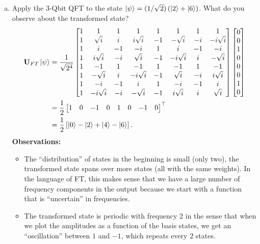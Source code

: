 \documentclass{book}
\theoremstyle{definition}
\newcommand{\nn}{\nonumber}
\newcommand{\f}[2]{\frac{#1}{#2}}
\newcommand{\lp}{\left(}
\newcommand{\rp}{\right)}
\newcommand{\lb}{\left[}
\newcommand{\rb}{\right]}
\newcommand{\lc}{\left\{}
\newcommand{\rc}{\right\}}
\newcommand{\U}{\mathbf{U}}
\begin{document}
\begin{enumerate}[(a)]
	\item Apply the 3-Qbit QFT to the state $\ket{\psi} = (1/\sqrt{2})\lp \ket{2} + \ket{6} \rp$. What do you observe about the transformed state? 
	\begin{align}
	\U_{FT}\ket{\psi} &= \f{1}{\sqrt{2^4}}\begin{bmatrix}
	1 & 1 & 1 & 1 & 1 & 1 & 1 & 1\\
	1 &\sqrt{i}&i&i\sqrt{i}&-1&-\sqrt{i}&-i&-i\sqrt{i}\\
	1&i&-1&-i&1&i&-1&-i\\
	1&i\sqrt{i}&-i&\sqrt{i}&-1&-i\sqrt{i}&i&-\sqrt{i}\\
	1 & -1 & 1 & -1 & 1 & -1 & 1 & -1\\
	1&-\sqrt{i}&i&-i\sqrt{i}&-1&\sqrt{i}&-i&i\sqrt{i}\\
	1&-i&-1&i&1&-i&-1&i\\
	1&-i\sqrt{i}&-i&-\sqrt{i}&-1&i\sqrt{i}&i&\sqrt{i}
	\end{bmatrix}
	\begin{bmatrix}
	0\\0\\1\\0\\0\\0\\1\\0
	\end{bmatrix}\nn\\
	&= \f{1}{{2}}\begin{bmatrix}
	1&0&-1&0&1&0&-1&0
	\end{bmatrix}^\top\nn\\
	&= \f{1}{2}\lb \ket{0} - \ket{2} + \ket{4} - \ket{6} \rb.
	\end{align}
	\textbf{Observations:} 
	
	
	\begin{itemize}
		
	\item The ``distribution'' of states in the beginning is small (only two), the transformed state spans over more states (all with the same weights). In the language of FT, this makes sense that we have a large number of frequency components in the output because we start with a function that is ``uncertain'' in frequencies. 
	
	\item The transformed state is periodic with frequency 2 in the sense that when we plot the amplitudes as a function of the basis states, we get an ``oscillation'' between $1$ and $-1$, which repeats every $2$ states.  
	

\end{itemize}
\end{enumerate}
\end{document}
